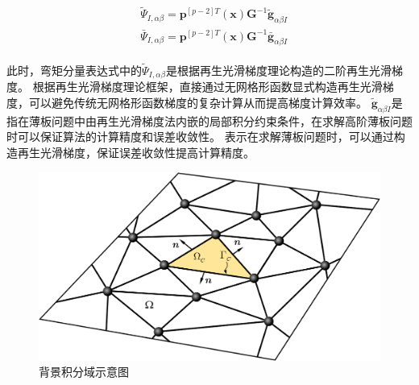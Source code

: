 \begin{align}
 \label{PTPSI}&\tilde{\Psi}_{I,\alpha\beta}=\pmb{p}^{[p-2]T}(\pmb x)\pmb G^{-1}\tilde{\pmb g}_{\alpha\beta I}\\
 \label{PBPSI}&\bar{\Psi}_{I,\alpha\beta}=\pmb{p}^{[p-2]T}(\pmb x)\pmb G^{-1}\bar{\pmb g}_{\alpha\beta I}
\end{align}\par
此时，弯矩分量表达式中的$\tilde{\Psi}_{I,\alpha\beta}$是根据再生光滑梯度理论\textsuperscript{\cite{wang2019}}构造的二阶再生光滑梯度。
根据再生光滑梯度理论框架，直接通过无网格形函数显式构造再生光滑梯度，可以避免传统无网格形函数梯度的复杂计算从而提高梯度计算效率。
$\tilde{\pmb g}_{\alpha\beta I}$是指在薄板问题中由再生光滑梯度法内嵌的局部积分约束条件，在求解高阶薄板问题时可以保证算法的计算精度和误差收敛性。
表示在求解薄板问题时，可以通过构造再生光滑梯度，保证误差收敛性提高计算精度。
\begin{figure}[H]
    \centering
    \includegraphics[scale=0.5]{figure/PHR/momentlisan.png}
    \caption{背景积分域示意图}\label{Pintegralscheme}
\end{figure}
